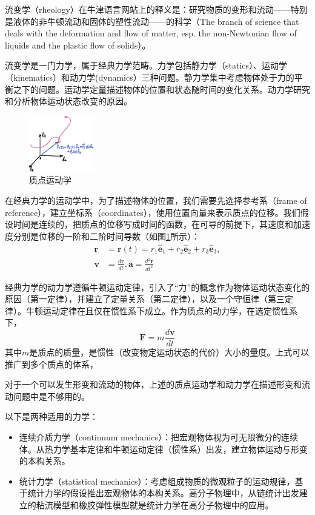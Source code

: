 \documentclass[main.tex]{subfiles}
\begin{document}
流变学（rheology）在牛津语言网站上的释义是：研究物质的变形和流动——特别是液体的非牛顿流动和固体的塑性流动——的科学（The branch of science that deals with the deformation and flow of matter, esp. the non-Newtonian flow of liquids and the plastic flow of solids）。

流变学是一门力学，属于经典力学范畴。力学包括静力学（statics）、运动学（kinematics）和动力学(dynamics）三种问题。静力学集中考虑物体处于力的平衡之下的问题。运动学定量描述物体的位置和状态随时间的变化关系。动力学研究和分析物体运动状态改变的原因。\cite[p.~1]{邓文基2009大物上}

\begin{figure}
\centering
\includegraphics[width=0.25\textwidth]{images/I.1.1.eps}
\caption{质点运动学}
\label{fig:I.1.1}
\end{figure}

在经典力学的运动学中，为了描述物体的位置，我们需要先选择参考系（frame of reference），建立坐标系（coordinates），使用位置向量来表示质点的位移。我们假设时间是连续的，把质点的位移写成时间的函数，在可导的前提下，其速度和加速度分别是位移的一阶和二阶时间导数\cite[附录A,p.~422]{邓文基2009大物上}（如图\ref{fig:I.1.1}所示）：
\begin{align*}
\mathbf{r}&=\mathbf{r}\left(t\right)=r_1\mathbf{\hat{e}}_1+r_2\mathbf{\hat{e}}_2+r_3\mathbf{\hat{e}}_3,\\
\mathbf{v}&=\frac{d\mathbf{r}}{dt},\mathbf{a}=\frac{d^2\mathbf{r}}{dt^2}
\end{align*}

经典力学的动力学遵循牛顿运动定律，引入了“力”的概念作为物体运动状态变化的原因（第一定律），并建立了定量关系（第二定律），以及一个守恒律（第三定律）。牛顿运动定律在且仅在惯性系下成立。作为质点的动力学，在选定惯性系下，
\[\mathbf{F}=m\frac{d\mathbf{v}}{dt}\]
其中$m$是质点的质量，是惯性（改变物定运动状态的代价）大小的量度。上式可以推广到多个质点的体系，

对于一个可以发生形变和流动的物体，上述的质点运动学和动力学在描述形变和流动问题中是不够用的。

以下是两种适用的力学：
\begin{itemize}
    \item 连续介质力学（continuum mechanics）：把宏观物体视为可无限微分的连续体。从热力学基本定律和牛顿运动定律（惯性系）出发，建立物体运动与形变的本构关系。
    \item 统计力学（statistical mechanics）：考虑组成物质的微观粒子的运动规律，基于统计力学的假设推出宏观物体的本构关系。高分子物理中，从链统计出发建立的粘流模型和橡胶弹性模型就是统计力学在高分子物理中的应用。
\end{itemize}
\end{document}
